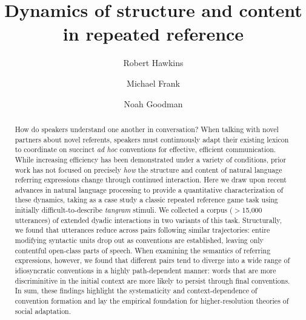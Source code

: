 \documentclass[alpha-refs]{wiley-article}
\title{Dynamics of structure and content in repeated reference}
\author[1]{Robert Hawkins}
\author[1]{Michael Frank}
\author[1,2]{Noah Goodman}
\affil[1]{Department of Psychology, Stanford University}
\affil[2]{Department of Computer Science, Stanford University}
\begin{document}
\maketitle





\begin{abstract}
How do speakers understand one another in conversation? 
When talking with novel partners about novel referents, speakers must continuously adapt their existing lexicon to coordinate on succinct \emph{ad hoc} conventions for effective, efficient communication.
While increasing efficiency has been demonstrated under a variety of conditions, prior work has not focused on precisely \emph{how} the structure and content of natural language referring expressions change through continued interaction.
Here we draw upon recent advances in natural language processing to provide a quantitative characterization of these dynamics, taking as a case study a classic repeated reference game task using initially difficult-to-describe \emph{tangram} stimuli.
We collected a corpus ($>$15,000 utterances) of extended dyadic interactions in two variants of this task.
Structurally, we found that utterances reduce across pairs following similar trajectories: entire modifying syntactic units drop out as conventions are established, leaving only contentful open-class parts of speech.
When examining the semantics of referring expressions, however, we found that different pairs tend to diverge into a wide range of idiosyncratic conventions in a highly path-dependent manner:  
words that are more discriminitive in the initial context are more likely to persist through final conventions.
In sum, these findings highlight the systematicity and context-dependence of convention formation and lay the empirical foundation for higher-resolution theories of social adaptation.

\end{abstract}
\end{document}
